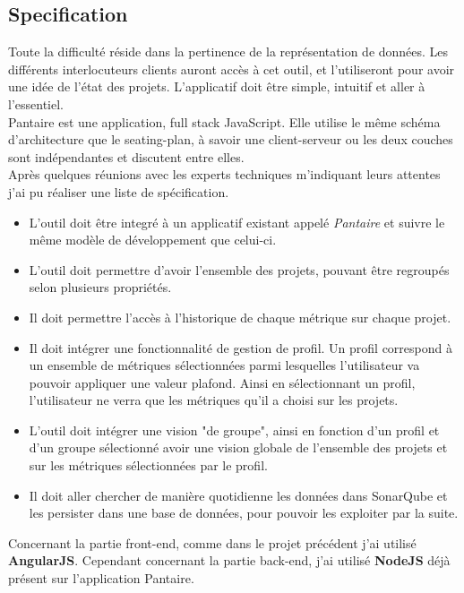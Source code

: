 \documentclass{report}
\newcommand{\jumpOne}{\\[1\baselineskip]}
\begin{document}
\subsection{Specification}
Toute la difficulté réside dans la pertinence de la représentation de données. Les différents interlocuteurs clients auront accès à cet outil, et l'utiliseront pour avoir une idée de l'état des projets. L'applicatif doit être simple, intuitif et aller à l'essentiel. 
\jumpOne
Pantaire est une application, \gls{full stack} JavaScript. Elle utilise le même schéma d'architecture que le seating-plan, à savoir une \gls{client-serveur} ou les deux couches sont indépendantes et discutent entre elles. 
\jumpOne
Après quelques réunions avec les experts techniques m'indiquant leurs attentes j'ai pu réaliser une liste de spécification. 
\begin{itemize}
	\item L'outil doit être integré à un applicatif existant appelé \emph{Pantaire} et suivre le même modèle de développement que celui-ci. 
	\item L'outil doit permettre d'avoir l'ensemble des projets, pouvant être regroupés selon plusieurs propriétés. 
	\item Il doit permettre l'accès à l'historique de chaque métrique sur chaque projet.   
	\item Il doit intégrer une fonctionnalité de gestion de profil. Un profil correspond à un ensemble de métriques sélectionnées parmi lesquelles l'utilisateur va pouvoir appliquer une valeur plafond. Ainsi en sélectionnant un profil, l'utilisateur ne verra que les métriques qu'il a choisi sur les projets.
	\item L'outil doit intégrer une vision "de groupe", ainsi en fonction d'un profil et d'un groupe sélectionné avoir une vision globale de l'ensemble des projets et sur les métriques sélectionnées par le profil.    
	\item Il doit aller chercher de manière quotidienne les données dans \gls{SonarQube} et les persister dans une base de données, pour pouvoir les exploiter par la suite. 
\end{itemize}  
Concernant la partie front-end, comme dans le projet précédent j'ai utilisé \textbf{AngularJS}. Cependant concernant la partie back-end, j'ai utilisé \textbf{NodeJS} déjà présent sur l'application Pantaire.
\jumpOne
\end{document}
